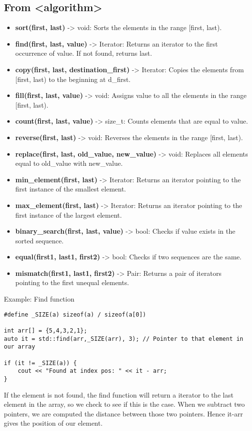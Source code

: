 \documentclass{report}
\begin{document}
    \subsection{From <algorithm>}
    \begin{itemize}
         \item \textbf{sort(first, last)} -> void: Sorts the elements in the range [first, last).
        \item \textbf{find(first, last, value)} -> Iterator: Returns an iterator to the first occurrence of value. If not found, returns last.
        \item \textbf{copy(first, last, destination\_first)} -> Iterator: Copies the elements from [first, last) to the beginning at d\_first.
        \item \textbf{fill(first, last, value)} -> void: Assigns value to all the elements in the range [first, last).
        \item \textbf{count(first, last, value)} -> size\_t: Counts elements that are equal to value.
        \item \textbf{reverse(first, last)} -> void: Reverses the elements in the range [first, last).
        \item \textbf{replace(first, last, old\_value, new\_value)} -> void: Replaces all elements equal to old\_value with new\_value.
        \item \textbf{min\_element(first, last)} -> Iterator: Returns an iterator pointing to the first instance of the smallest element.
        \item \textbf{max\_element(first, last)} -> Iterator: Returns an iterator pointing to the first instance of the largest element.
        \item \textbf{binary\_search(first, last, value)} -> bool: Checks if value exists in the sorted sequence.
        \item \textbf{equal(first1, last1, first2)} -> bool: Checks if two sequences are the same.
        \item \textbf{mismatch(first1, last1, first2)} -> Pair: Returns a pair of iterators pointing to the first unequal elements.
    \end{itemize}
    \bigbreak \noindent \bigbreak \noindent 
    Example: Find function
    \smallbreak \noindent
    \begin{verbatim}
#define _SIZE(a) sizeof(a) / sizeof(a[0])

int arr[] = {5,4,3,2,1};
auto it = std::find(arr,_SIZE(arr), 3); // Pointer to that element in our array

if (it != _SIZE(a)) {
    cout << "Found at index pos: " << it - arr;
}
    \end{verbatim}
    \bigbreak \noindent 
    If the element is not found, the find function will return a iterator to the last element in the array, so we check to see if this is the case.
    When we subtract two pointers, we are computed the distance between those two pointers. Hence it-arr gives the position of our element.
\end{document}
